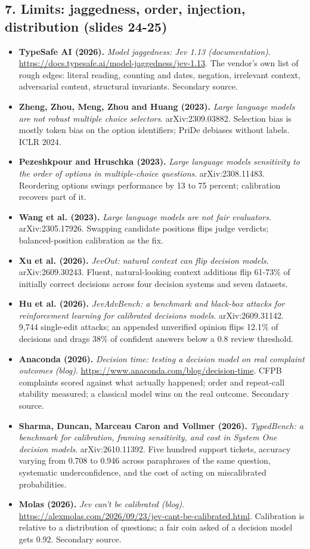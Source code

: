 \documentclass[11pt,letterpaper]{article}
\begin{document}
\subsection*{7. Limits: jaggedness, order, injection, distribution (slides 24-25)}
\begin{itemize}[leftmargin=1.2em,itemsep=3pt]\sloppy
\item \textbf{TypeSafe AI (2026).} \textit{Model jaggedness: Jev 1.13 (documentation)}. \url{https://docs.typesafe.ai/model-jaggedness/jev-1.13}. The vendor's own list of rough edges: literal reading, counting and dates, negation, irrelevant context, adversarial content, structural invariants. Secondary source.
\item \textbf{Zheng, Zhou, Meng, Zhou and Huang (2023).} \textit{Large language models are not robust multiple choice selectors}. arXiv:2309.03882. Selection bias is mostly token bias on the option identifiers; PriDe debiases without labels. ICLR 2024.
\item \textbf{Pezeshkpour and Hruschka (2023).} \textit{Large language models sensitivity to the order of options in multiple-choice questions}. arXiv:2308.11483. Reordering options swings performance by 13 to 75 percent; calibration recovers part of it.
\item \textbf{Wang et al. (2023).} \textit{Large language models are not fair evaluators}. arXiv:2305.17926. Swapping candidate positions flips judge verdicts; balanced-position calibration as the fix.
\item \textbf{Xu et al. (2026).} \textit{JevOut: natural context can flip decision models}. arXiv:2609.30243. Fluent, natural-looking context additions flip 61-73\% of initially correct decisions across four decision systems and seven datasets.
\item \textbf{Hu et al. (2026).} \textit{JevAdvBench: a benchmark and black-box attacks for reinforcement learning for calibrated decisions models}. arXiv:2609.31142. 9,744 single-edit attacks; an appended unverified opinion flips 12.1\% of decisions and drags 38\% of confident answers below a 0.8 review threshold.
\item \textbf{Anaconda (2026).} \textit{Decision time: testing a decision model on real complaint outcomes (blog)}. \url{https://www.anaconda.com/blog/decision-time}. CFPB complaints scored against what actually happened; order and repeat-call stability measured; a classical model wins on the real outcome. Secondary source.
\item \textbf{Sharma, Duncan, Marceau Caron and Vollmer (2026).} \textit{TypedBench: a benchmark for calibration, framing sensitivity, and cost in System One decision models}. arXiv:2610.11392. Five hundred support tickets, accuracy varying from 0.708 to 0.946 across paraphrases of the same question, systematic underconfidence, and the cost of acting on miscalibrated probabilities.
\item \textbf{Molas (2026).} \textit{Jev can't be calibrated (blog)}. \url{https://alexmolas.com/2026/09/23/jev-cant-be-calibrated.html}. Calibration is relative to a distribution of questions; a fair coin asked of a decision model gets 0.92. Secondary source.
\end{itemize}
\end{document}
